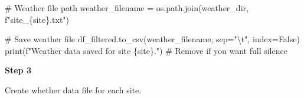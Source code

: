\documentclass[
  letterpaper,
  DIV=11,
  numbers=noendperiod]{scrartcl}
\newenvironment{Shaded}{\begin{snugshade}}{\end{snugshade}}
\newcommand{\BuiltInTok}[1]{\textcolor[rgb]{0.00,0.23,0.31}{#1}}
\newcommand{\CharTok}[1]{\textcolor[rgb]{0.13,0.47,0.30}{#1}}
\newcommand{\CommentTok}[1]{\textcolor[rgb]{0.37,0.37,0.37}{#1}}
\newcommand{\NormalTok}[1]{\textcolor[rgb]{0.00,0.23,0.31}{#1}}
\newcommand{\OperatorTok}[1]{\textcolor[rgb]{0.37,0.37,0.37}{#1}}
\newcommand{\SpecialCharTok}[1]{\textcolor[rgb]{0.37,0.37,0.37}{#1}}
\newcommand{\SpecialStringTok}[1]{\textcolor[rgb]{0.13,0.47,0.30}{#1}}
\newcommand{\StringTok}[1]{\textcolor[rgb]{0.13,0.47,0.30}{#1}}
\newcommand{\VariableTok}[1]{\textcolor[rgb]{0.07,0.07,0.07}{#1}}
\begin{document}
\begin{Shaded}
\begin{Highlighting}[]
    \CommentTok{\# Weather file path}
\NormalTok{    weather\_filename }\OperatorTok{=}\NormalTok{ os.path.join(weather\_dir, }\SpecialStringTok{f"site\_}\SpecialCharTok{\{}\NormalTok{site}\SpecialCharTok{\}}\SpecialStringTok{.txt"}\NormalTok{)}
    
    \CommentTok{\# Save weather file}
\NormalTok{    df\_filtered.to\_csv(weather\_filename, sep}\OperatorTok{=}\StringTok{"}\CharTok{\textbackslash{}t}\StringTok{"}\NormalTok{, index}\OperatorTok{=}\VariableTok{False}\NormalTok{)}
    \BuiltInTok{print}\NormalTok{(}\SpecialStringTok{f"Weather data saved for site }\SpecialCharTok{\{}\NormalTok{site}\SpecialCharTok{\}}\SpecialStringTok{."}\NormalTok{)  }\CommentTok{\# Remove if you want full silence}
\end{Highlighting}
\end{Shaded}

\textbf{Step 3}

Create whether data file for each site.
\end{document}
